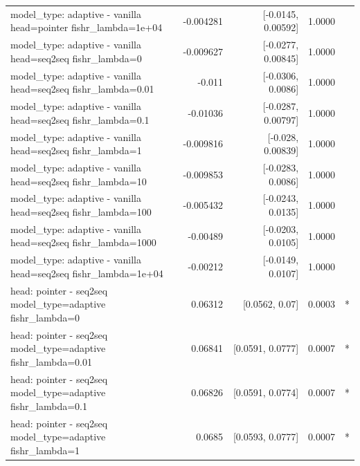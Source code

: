 \documentclass[10pt]{article}
\makeatletter
\newcommand{\stackcell}[1]{\begin{tabular}[t]{@{}l@{}}#1\end{tabular}}
\makeatother
\begin{document}
{\begin{longtable}{lrrrl}
\stackcell{model\_type: adaptive - vanilla\\\footnotesize head=pointer fishr\_lambda=1e+04 } & -0.004281 & [-0.0145, 0.00592] & 1.0000 & \\
\stackcell{model\_type: adaptive - vanilla\\\footnotesize head=seq2seq fishr\_lambda=0 } & -0.009627 & [-0.0277, 0.00845] & 1.0000 & \\
\stackcell{model\_type: adaptive - vanilla\\\footnotesize head=seq2seq fishr\_lambda=0.01 } & -0.011 & [-0.0306, 0.0086] & 1.0000 & \\
\stackcell{model\_type: adaptive - vanilla\\\footnotesize head=seq2seq fishr\_lambda=0.1 } & -0.01036 & [-0.0287, 0.00797] & 1.0000 & \\
\stackcell{model\_type: adaptive - vanilla\\\footnotesize head=seq2seq fishr\_lambda=1 } & -0.009816 & [-0.028, 0.00839] & 1.0000 & \\
\stackcell{model\_type: adaptive - vanilla\\\footnotesize head=seq2seq fishr\_lambda=10 } & -0.009853 & [-0.0283, 0.0086] & 1.0000 & \\
\stackcell{model\_type: adaptive - vanilla\\\footnotesize head=seq2seq fishr\_lambda=100 } & -0.005432 & [-0.0243, 0.0135] & 1.0000 & \\
\stackcell{model\_type: adaptive - vanilla\\\footnotesize head=seq2seq fishr\_lambda=1000 } & -0.00489 & [-0.0203, 0.0105] & 1.0000 & \\
\stackcell{model\_type: adaptive - vanilla\\\footnotesize head=seq2seq fishr\_lambda=1e+04 } & -0.00212 & [-0.0149, 0.0107] & 1.0000 & \\
\stackcell{head: pointer - seq2seq\\\footnotesize model\_type=adaptive fishr\_lambda=0 } & 0.06312 & [0.0562, 0.07] & 0.0003 & *\\
\stackcell{head: pointer - seq2seq\\\footnotesize model\_type=adaptive fishr\_lambda=0.01 } & 0.06841 & [0.0591, 0.0777] & 0.0007 & *\\
\stackcell{head: pointer - seq2seq\\\footnotesize model\_type=adaptive fishr\_lambda=0.1 } & 0.06826 & [0.0591, 0.0774] & 0.0007 & *\\
\stackcell{head: pointer - seq2seq\\\footnotesize model\_type=adaptive fishr\_lambda=1 } & 0.0685 & [0.0593, 0.0777] & 0.0007 & *\\

\end{longtable}}
\end{document}
